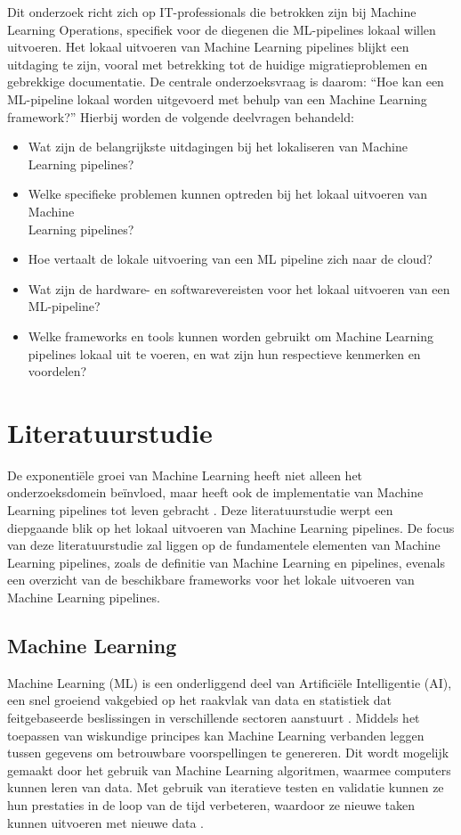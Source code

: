 Dit onderzoek richt zich op IT-professionals die betrokken zijn bij Machine Learning Operations, specifiek voor de diegenen die ML-pipelines lokaal willen uitvoeren.
Het lokaal uitvoeren van Machine Learning pipelines blijkt een uitdaging te zijn, vooral met betrekking tot de huidige migratieproblemen en gebrekkige documentatie.
De centrale onderzoeksvraag is daarom: ``Hoe kan een ML-pipeline lokaal worden uitgevoerd met behulp van een Machine Learning framework?''
Hierbij worden de volgende deelvragen behandeld:
\begin{itemize}
  \item Wat zijn de belangrijkste uitdagingen bij het lokaliseren van Machine Learning pipelines?
  \item Welke specifieke problemen kunnen optreden bij het lokaal uitvoeren van Machine\\ Learning pipelines?
  \item Hoe vertaalt de lokale uitvoering van een ML pipeline zich naar de cloud?
  \item Wat zijn de hardware- en softwarevereisten voor het lokaal uitvoeren van een ML-pipeline?
  \item Welke frameworks en tools kunnen worden gebruikt om Machine Learning pipelines lokaal uit te voeren, en wat zijn hun respectieve kenmerken en voordelen?
\end{itemize}



\section{Literatuurstudie}%
\label{sec:state-of-the-art}
De exponentiële groei van Machine Learning heeft niet alleen het onderzoeksdomein beïnvloed, maar heeft ook de implementatie van Machine Learning pipelines tot leven gebracht \autocite{Aggarwal2022}.
Deze literatuurstudie werpt een diepgaande blik op het lokaal uitvoeren van Machine Learning pipelines.
De focus van deze literatuurstudie zal liggen op de fundamentele elementen van Machine Learning pipelines, zoals de definitie van Machine Learning en pipelines, evenals een overzicht van de beschikbare frameworks voor het lokale uitvoeren van Machine Learning pipelines.
\subsection{Machine Learning}
Machine Learning (ML) is een onderliggend deel van Artificiële Intelligentie (AI), een snel groeiend vakgebied op het raakvlak van data en statistiek dat feitgebaseerde beslissingen in verschillende sectoren aanstuurt \autocite{Jordan2015}.
Middels het toepassen van wiskundige principes kan Machine Learning verbanden leggen tussen gegevens om betrouwbare voorspellingen te genereren. Dit wordt mogelijk gemaakt door het gebruik van Machine Learning algoritmen, waarmee computers kunnen leren van data. Met gebruik van iteratieve testen en validatie kunnen ze hun prestaties in de loop van de tijd verbeteren, waardoor ze nieuwe taken kunnen uitvoeren met nieuwe data \autocite{Shaveta2023}.
